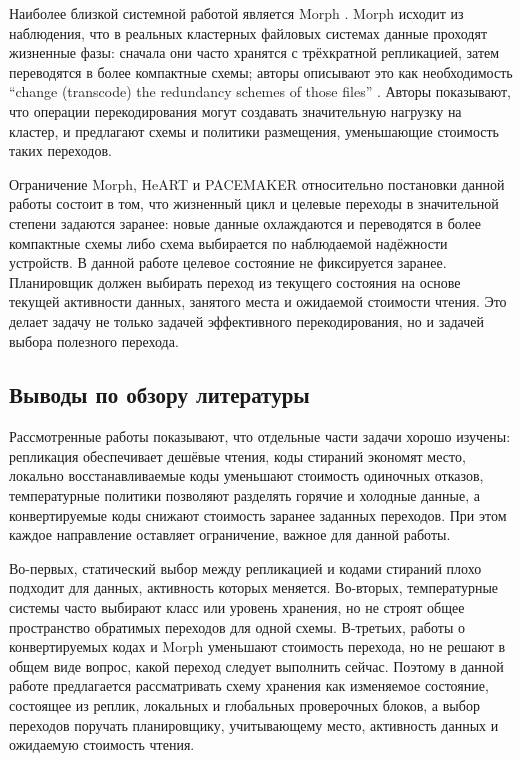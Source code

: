 Наиболее близкой системной работой является Morph \cite{kim2024morph}. Morph
исходит из наблюдения, что в реальных кластерных файловых системах данные
проходят жизненные фазы: сначала они часто хранятся с трёхкратной репликацией,
затем переводятся в более компактные схемы; авторы описывают это как необходимость
\enquote{change (transcode) the redundancy schemes of those files} \cite{kim2024morph}.
Авторы показывают, что операции
перекодирования могут создавать значительную нагрузку на кластер, и предлагают
схемы и политики размещения, уменьшающие стоимость таких переходов.

Ограничение Morph, HeART и PACEMAKER относительно постановки данной работы
состоит в том, что жизненный цикл и целевые переходы в значительной степени
задаются заранее: новые данные охлаждаются и переводятся в более компактные
схемы либо схема выбирается по наблюдаемой надёжности устройств. В данной
работе целевое состояние не фиксируется заранее. Планировщик должен выбирать
переход из текущего состояния на основе текущей активности данных, занятого
места и ожидаемой стоимости чтения. Это делает задачу не только задачей
эффективного перекодирования, но и задачей выбора полезного перехода.

\subsection*{Выводы по обзору литературы}

Рассмотренные работы показывают, что отдельные части задачи хорошо изучены:
репликация обеспечивает дешёвые чтения, коды стираний экономят место,
локально восстанавливаемые коды уменьшают стоимость одиночных отказов,
температурные политики позволяют разделять горячие и холодные данные, а
конвертируемые коды снижают стоимость заранее заданных переходов. При этом
каждое направление оставляет ограничение, важное для данной работы.

Во-первых, статический выбор между репликацией и кодами стираний плохо
подходит для данных, активность которых меняется. Во-вторых, температурные
системы часто выбирают класс или уровень хранения, но не строят общее
пространство обратимых переходов для одной схемы. В-третьих, работы о
конвертируемых кодах и Morph уменьшают стоимость перехода, но не решают в
общем виде вопрос, какой переход следует выполнить сейчас. Поэтому в данной
работе предлагается рассматривать схему хранения как изменяемое состояние,
состоящее из реплик, локальных и глобальных проверочных блоков, а выбор
переходов поручать планировщику, учитывающему место, активность данных и
ожидаемую стоимость чтения.

\pagebreak

